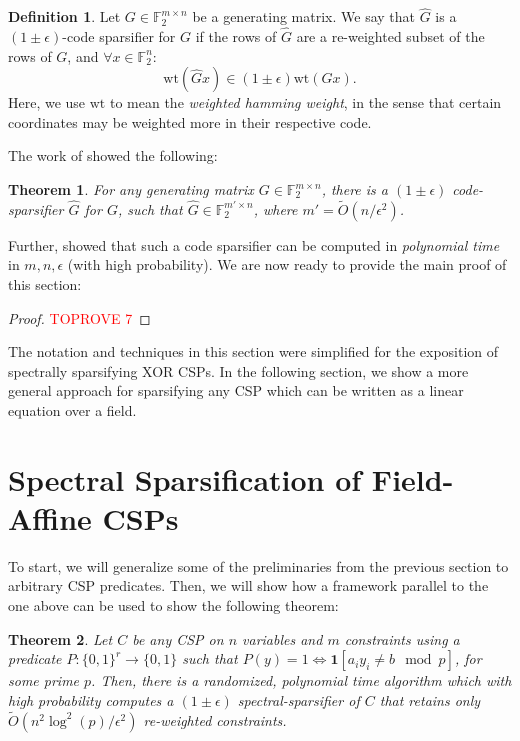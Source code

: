 \documentclass[11pt]{article}
\newtheorem{theorem}{Theorem}[section]
\theoremstyle{definition}
\newtheorem{definition}{Definition}[section]
\newcommand{\F}{\mathbb{F}}
\newcommand{\zo}{\{0, 1\}}
\newcommand{\eps}{\epsilon}
\newcommand{\wt}{\mathrm{wt}}
\begin{document}
\begin{definition}
	Let $G \in \F_2^{m \times n}$ be a generating matrix. We say that $\hat{G}$ is a $(1 \pm \eps)$-code sparsifier for $G$ if the rows of $\hat{G}$ are a re-weighted subset of the rows of $G$, and $\forall x \in \F_2^n$:
	\[
	\wt(\hat{G}x) \in (1 \pm \eps) \wt(Gx).
	\]
	Here, we use $\wt$ to mean the \emph{weighted hamming weight}, in the sense that certain coordinates may be weighted more in their respective code. 
\end{definition}

The work of \cite{KPS24} showed the following:

\begin{theorem}\cite{KPS24}\label{thm:codeSparsification}
	For any generating matrix $G \in \F_2^{m \times n}$, there is a $(1 \pm \eps)$ code-sparsifier $\hat{G}$ for $G$, such that $\hat{G} \in \F_2^{m' \times n}$, where $m' = \widetilde{O}(n / \eps^2)$.
\end{theorem}

Further, \cite{KPS24c} showed that such a code sparsifier can be computed in \emph{polynomial time} in $m, n, \eps$ (with high probability). We are now ready to provide the main proof of this section:

\begin{proof}\textcolor{red}{TOPROVE 7}\end{proof}

The notation and techniques in this section were simplified for the exposition of spectrally sparsifying XOR CSPs. In the following section, we show a more general approach for sparsifying any CSP which can be written as a linear equation over a field. 

\section{Spectral Sparsification of Field-Affine CSPs}\label{sec:generalProof}

To start, we will generalize some of the preliminaries from the previous section to arbitrary CSP predicates. Then, we will show how a framework parallel to the one above can be used to show the following theorem:

\begin{theorem}\label{thm:generalCSP}
    Let $C$ be any CSP on $n$ variables and $m$ constraints using a predicate $P: \zo^r \rightarrow \zo$ such that $P(y) = 1 \iff \mathbf{1}[a_i y_i \neq b \mod p]$, for some prime $p$. Then, there is a randomized, polynomial time algorithm which with high probability computes a $(1 \pm \eps)$ spectral-sparsifier of $C$ that retains only $\widetilde{O}(n^2 \log^2(p) / \eps^2)$ re-weighted constraints.
\end{theorem}
\end{document}
